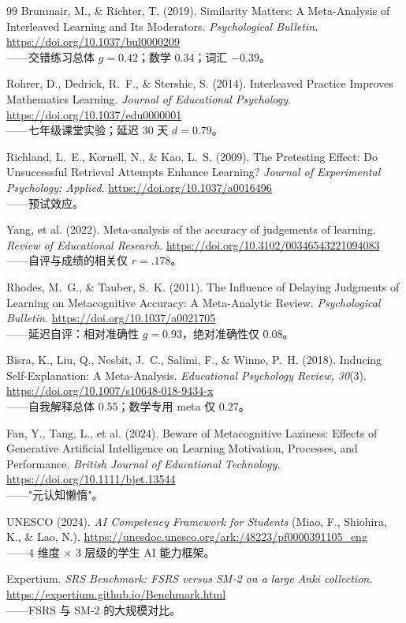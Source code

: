 \documentclass[11pt,a4paper,UTF8,fontset=windows]{ctexart}
\begin{document}
\begin{thebibliography}{99}
 Brunmair, M., \& Richter, T. (2019). Similarity Matters: A
Meta-Analysis of Interleaved Learning and Its Moderators. \emph{Psychological Bulletin.}
\url{https://doi.org/10.1037/bul0000209}
\\ ——交错练习总体 \(g = 0.42\)；数学 0.34；词汇 $-0.39$。

 Rohrer, D., Dedrick, R.~F., \& Stershic, S. (2014). Interleaved
Practice Improves Mathematics Learning. \emph{Journal of Educational Psychology.}
\url{https://doi.org/10.1037/edu0000001}
\\ ——七年级课堂实验；延迟 30 天 \(d = 0.79\)。

 Richland, L.~E., Kornell, N., \& Kao, L.~S. (2009). The Pretesting
Effect: Do Unsuccessful Retrieval Attempts Enhance Learning? \emph{Journal of Experimental
Psychology: Applied.} \url{https://doi.org/10.1037/a0016496}
\\ ——预试效应。

 Yang, et al. (2022). Meta-analysis of the accuracy of judgements of
learning. \emph{Review of Educational Research.}
\url{https://doi.org/10.3102/00346543221094083}
\\ ——自评与成绩的相关仅 \(r = .178\)。

 Rhodes, M.~G., \& Tauber, S.~K. (2011). The Influence of Delaying
Judgments of Learning on Metacognitive Accuracy: A Meta-Analytic Review. \emph{Psychological
Bulletin.} \url{https://doi.org/10.1037/a0021705}
\\ ——延迟自评：相对准确性 \(g = 0.93\)，绝对准确性仅 0.08。

 Bisra, K., Liu, Q., Nesbit, J.~C., Salimi, F., \& Winne, P.~H. (2018).
Inducing Self-Explanation: A Meta-Analysis. \emph{Educational Psychology Review, 30}(3).
\url{https://doi.org/10.1007/s10648-018-9434-x}
\\ ——自我解释总体 0.55；数学专用 meta 仅 0.27。

 Fan, Y., Tang, L., et al. (2024). Beware of Metacognitive Laziness: Effects
of Generative Artificial Intelligence on Learning Motivation, Processes, and Performance.
\emph{British Journal of Educational Technology.}
\url{https://doi.org/10.1111/bjet.13544}
\\ ——"元认知懒惰"。

 UNESCO (2024). \emph{AI Competency Framework for Students} (Miao, F.,
Shiohira, K., \& Lao, N.). \url{https://unesdoc.unesco.org/ark:/48223/pf0000391105_eng}
\\ ——4 维度 × 3 层级的学生 AI 能力框架。

 Expertium. \emph{SRS Benchmark: FSRS versus SM-2 on a large Anki
collection.} \url{https://expertium.github.io/Benchmark.html}
\\ ——FSRS 与 SM-2 的大规模对比。

\end{thebibliography}
\end{document}
